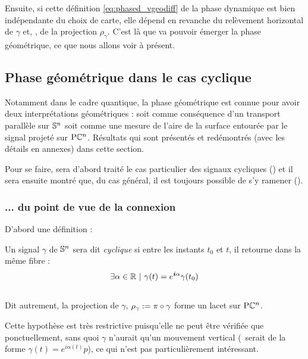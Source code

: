 Ensuite, si cette définition \eqref{eq:phased_vgeodiff} de la phase dynamique est bien indépendante du choix de carte, elle dépend en revanche du relèvement horizontal de $\gamma$ et, \afortiori, de la projection $\rho_\gamma$. C'est là que va pouvoir émerger la phase géométrique, ce que nous allons voir à présent.
\\



\subsection{Phase géométrique dans le cas cyclique} \label{subsec:phase_g-cycl}

Notamment dans le cadre quantique, la phase géométrique est connue pour avoir deux interprétations géométriques \cite{bohm_geometric_2003, chruscinski_geometric_2004,faure_introduction_2022} : soit comme conséquence d'un transport parallèle sur $\S{n}$ soit comme une mesure de l'aire de la surface entourée par le signal projeté sur $\PC{n}$. Résultats qui sont présentés et redémontrés (avec les détails en annexes) dans cette section.

Pour se faire, sera d'abord traité le cas particulier des signaux cycliques () et il sera ensuite montré que, du cas général, il est toujours possible de s'y ramener ().
\skipl



\subsubsection{... du point de vue de la connexion} \label{subsec:phase_g2cycl}

D'abord une définition :

\begin{definition} \label{def:traj_cycl}
	Un signal $\gamma$ de $\S{n}$ sera dit \emph{cyclique} si entre les instants $t_0$ et $t$, il retourne dans la même fibre :
	\begin{equation}\label{eq:def2cycl}
		\exists \alpha \in\R\ |\ \gamma(t) = e^{\i \alpha}\gamma(t_0)
	\end{equation}
	\\
	Dit autrement, la projection de $\gamma$, $\rho_\gamma \defeq \pi\circ\gamma$ forme un lacet sur $\PC{n}$.
\end{definition}
Cette hypothèse est très restrictive puisqu'elle ne peut être vérifiée que ponctuellement, sans quoi $\gamma$ n'aurait qu'un mouvement vertical (\ie~serait de la forme $\gamma(t) = e^{i\alpha(t)}p$), ce qui n'est pas particulièrement intéressant.
\\


